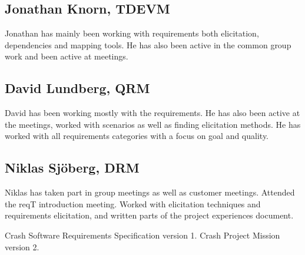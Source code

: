 \documentclass[10pt]{article}
\begin{document}
\subsection{Jonathan Knorn, TDEVM}
Jonathan has mainly been working with requirements both elicitation, dependencies and mapping tools. 
He has also been active in the common group work and been active at meetings.
\subsection{David Lundberg, QRM}
David has been working mostly with the requirements. He has also been active at the meetings, worked with scenarios as well as finding elicitation methods. He has worked with all requirements categories with a focus on goal and quality. 
\subsection{Niklas Sjöberg, DRM}
Niklas has taken part in group meetings as well as customer meetings. Attended the reqT introduction meeting. Worked with elicitation techniques and requirements elicitation, and written parts of the project experiences document. 

\begin{thebibliography}{1}
 Crash Software Requirements Specification version 1. 
 Crash Project Mission version 2.
\end{thebibliography}
\end{document}

